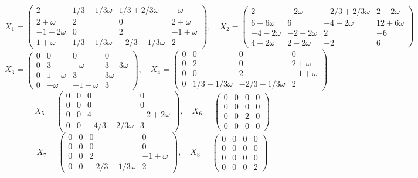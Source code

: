 \documentclass[11pt]{amsart}
\theoremstyle{definition}
\theoremstyle{remark}
\begin{document}
{\footnotesize
\[
X_{1}=\left(\begin{smallmatrix}2&1/3-1/3\omega&1/3+2/3\omega&-\omega\\2+\omega&2&0&2+\omega\\-1-2\omega&0&2&-1+\omega\\1+\omega&1/3-1/3\omega&-2/3-1/3\omega&2\end{smallmatrix}\right),\quad X_{2}=\left(\begin{smallmatrix}2&-2\omega&-2/3+2/3\omega&2-2\omega\\6+6\omega&6&-4-2\omega&12+6\omega\\-4-2\omega&-2+2\omega&2&-6\\4+2\omega&2-2\omega&-2&6\end{smallmatrix}\right)
\]
\[
X_{3}=\left(\begin{smallmatrix}0&0&0&0\\0&3&-\omega&3+3\omega\\0&1+\omega&3&3\omega\\0&-\omega&-1-\omega&3\end{smallmatrix}\right),\quad X_{4}=\left(\begin{smallmatrix}0&0&0&0\\0&2&0&2+\omega\\0&0&2&-1+\omega\\0&1/3-1/3\omega&-2/3-1/3\omega&2\end{smallmatrix}\right)
\]
\[
X_{5}=\left(\begin{smallmatrix}0&0&0&0\\0&0&0&0\\0&0&4&-2+2\omega\\0&0&-4/3-2/3\omega&3\end{smallmatrix}\right),\quad X_{6}=\left(\begin{smallmatrix}0&0&0&0\\0&0&0&0\\0&0&2&0\\0&0&0&0\end{smallmatrix}\right)
\]
\[
X_{7}=\left(\begin{smallmatrix}0&0&0&0\\0&0&0&0\\0&0&2&-1+\omega\\0&0&-2/3-1/3\omega&2\end{smallmatrix}\right),\quad X_{8}=\left(\begin{smallmatrix}0&0&0&0\\0&0&0&0\\0&0&0&0\\0&0&0&2\end{smallmatrix}\right)
\]}
\end{document}

